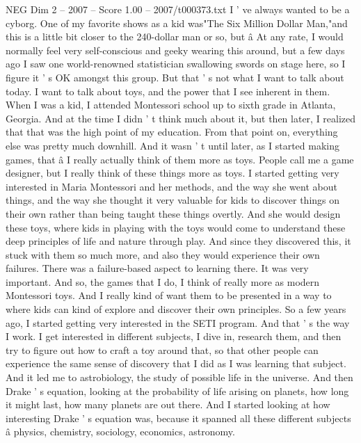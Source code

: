 \begin{textsample}{NEG Dim 2 – 2007 – Score 1.00 – 2007/t000373.txt}  \label{ex:f2_neg_008}
I ' ve always wanted to be a cyborg.
One of my favorite shows as a kid was"The Six Million Dollar Man,"and this is a little bit closer to the 240-dollar man or so, but â At any rate, I would normally feel very self-conscious and geeky wearing this around, but a few days ago I saw one world-renowned statistician swallowing swords on stage here, so I figure it ' s OK amongst this group.
But that ' s not what I want to talk about today.
I want to talk about toys, and the power that I see inherent in them.
When I was a kid, I attended Montessori school up to sixth grade in Atlanta, Georgia.
And at the time I didn ' t think much about it, but then later, I realized that that was the high point of my education.
From that point on, everything else was pretty much downhill.
And it wasn ' t until later, as I started making games, that â I really actually think of them more as toys.
People call me a game designer, but I really think of these things more as toys.
I started getting very interested in Maria Montessori and her methods, and the way she went about things, and the way she thought it very valuable for kids to discover things on their own rather than being taught these things overtly.
And she would design these toys, where kids in playing with the toys would come to understand these deep principles of life and nature through play.
And since they discovered this, it stuck with them so much more, and also they would experience their own failures.
There was a failure-based aspect to learning there.
It was very important.
And so, the games that I do, I think of really more as modern Montessori toys.
And I really kind of want them to be presented in a way to where kids can kind of explore and discover their own principles.
So a few years ago, I started getting very interested in the SETI program.
And that ' s the way I work.
I get interested in different subjects, I dive in, research them, and then try to figure out how to craft a toy around that, so that other people can experience the same sense of discovery that I did as I was learning that subject.
And it led me to astrobiology, the study of possible life in the universe.
And then Drake ' s equation, looking at the probability of life arising on planets, how long it might last, how many planets are out there.
And I started looking at how interesting Drake ' s equation was, because it spanned all these different subjects â physics, chemistry, sociology, economics, astronomy.

\end{textsample}
